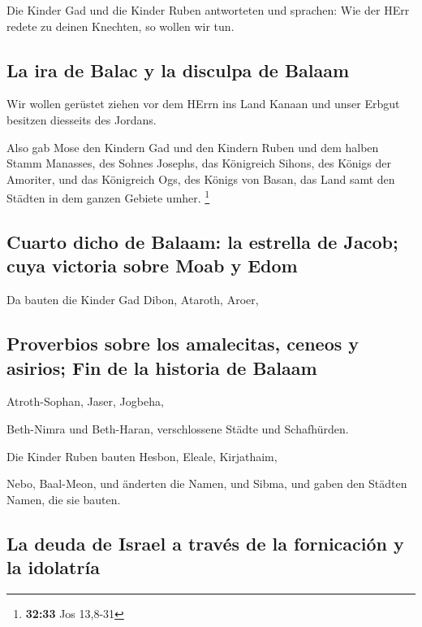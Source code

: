  Die Kinder Gad und die Kinder Ruben antworteten und
sprachen: Wie der HErr redete zu deinen Knechten, so wollen wir tun.

\hypertarget{la-ira-de-balac-y-la-disculpa-de-balaam}{%
\subsection{La ira de Balac y la disculpa de
Balaam}\label{la-ira-de-balac-y-la-disculpa-de-balaam}}

 Wir wollen gerüstet ziehen vor dem HErrn ins Land Kanaan
und unser Erbgut besitzen diesseits des Jordans.

 Also gab Mose den Kindern Gad und den Kindern Ruben und
dem halben Stamm Manasses, des Sohnes Josephs, das Königreich Sihons,
des Königs der Amoriter, und das Königreich Ogs, des Königs von Basan,
das Land samt den Städten in dem ganzen Gebiete umher. \footnote{\textbf{32:33}
  Jos 13,8-31}

\hypertarget{cuarto-dicho-de-balaam-la-estrella-de-jacob-cuya-victoria-sobre-moab-y-edom}{%
\subsection{Cuarto dicho de Balaam: la estrella de Jacob; cuya victoria
sobre Moab y
Edom}\label{cuarto-dicho-de-balaam-la-estrella-de-jacob-cuya-victoria-sobre-moab-y-edom}}

 Da bauten die Kinder Gad Dibon, Ataroth, Aroer,

\hypertarget{proverbios-sobre-los-amalecitas-ceneos-y-asirios-fin-de-la-historia-de-balaam}{%
\subsection{Proverbios sobre los amalecitas, ceneos y asirios; Fin de la
historia de
Balaam}\label{proverbios-sobre-los-amalecitas-ceneos-y-asirios-fin-de-la-historia-de-balaam}}

 Atroth-Sophan, Jaser, Jogbeha,

 Beth-Nimra und Beth-Haran, verschlossene Städte und
Schafhürden.

 Die Kinder Ruben bauten Hesbon, Eleale, Kirjathaim,

 Nebo, Baal-Meon, und änderten die Namen, und Sibma, und
gaben den Städten Namen, die sie bauten.

\hypertarget{la-deuda-de-israel-a-travuxe9s-de-la-fornicaciuxf3n-y-la-idolatruxeda}{%
\subsection{La deuda de Israel a través de la fornicación y la
idolatría}\label{la-deuda-de-israel-a-travuxe9s-de-la-fornicaciuxf3n-y-la-idolatruxeda}}


